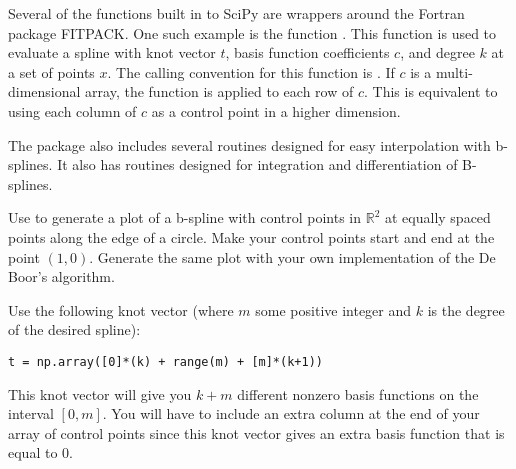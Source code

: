 Several of the functions built in to SciPy are wrappers around the Fortran package FITPACK.
One such example is the function .
This function is used to evaluate a spline with knot vector $t$, basis function coefficients $c$, and degree $k$ at a set of points $x$.
The calling convention for this function is .
If $c$ is a multi-dimensional array, the function is applied to each row of $c$.
This is equivalent to using each column of $c$ as a control point in a higher dimension.

The package  also includes several routines designed for easy interpolation with b-splines.
It also has routines designed for integration and differentiation of B-splines.

\begin{problem}
Use  to generate a plot of a b-spline with control points in $\mathbb{R}^2$ at equally spaced points along the edge of a circle.
Make your control points start and end at the point $\left(1, 0\right)$.
Generate the same plot with your own implementation of the De Boor's algorithm.

Use the following knot vector (where $m$ some positive integer and $k$ is the degree of the desired spline):
\begin{lstlisting}
t = np.array([0]*(k) + range(m) + [m]*(k+1))
\end{lstlisting}
This knot vector will give you $k + m$ different nonzero basis functions on the interval $\left[0, m\right]$.
You will have to include an extra column at the end of your array of control points since this knot vector gives an extra basis function that is equal to $0$.
\end{problem}

